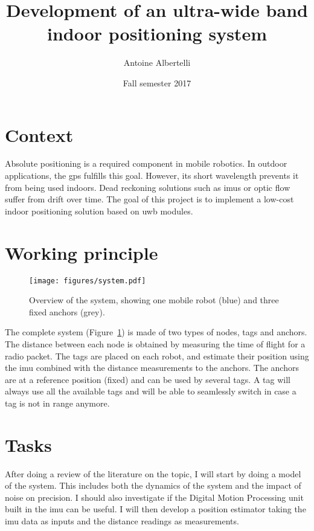 \documentclass[a4paper,twocolumn]{article}
\date{Fall semester 2017}
\title{Development of an ultra-wide band indoor positioning system}
\author{Antoine Albertelli}
\begin{document}
\maketitle
{}

\section{Context}

Absolute positioning is a required component in mobile robotics.
In outdoor applications, the \gls{gps} fulfills this goal.
However, its short wavelength prevents it from being used indoors.
Dead reckoning solutions such as \glspl{imu} or optic flow suffer from drift over time.
The goal of this project is to implement a low-cost indoor positioning solution based on \gls{uwb} modules.

\section{Working principle}

\begin{figure}[h!]
    \centering
    \texttt{[image: figures/system.pdf]}
    \caption{Overview of the system, showing one mobile robot (blue) and three fixed anchors (grey).}
    \label{fig:system}
\end{figure}

The complete system (Figure~\ref{fig:system}) is made of two types of nodes, tags and anchors.
The distance between each node is obtained by measuring the time of flight for a radio packet.
The tags are placed on each robot, and estimate their position using the \gls{imu} combined with the distance measurements to the anchors.
The anchors are at a reference position (fixed) and can be used by several tags.
A tag will always use all the available tags and will be able to seamlessly switch in case a tag is not in range anymore.

\section{Tasks}

After doing a review of the literature on the topic, I will start by doing a model of the system.
This includes both the dynamics of the system and the impact of noise on precision.
I should also investigate if the Digital Motion Processing unit built in the \gls{imu} can be useful.
I will then develop a position estimator taking the \gls{imu} data as inputs and the distance readings as measurements.
\end{document}
